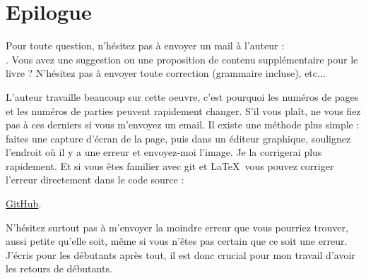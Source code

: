﻿\part*{Epilogue}


Pour toute question, n'hésitez pas à envoyer un mail à l'auteur : \\
\GTT{<\EMAIL>}.
Vous avez une suggestion ou une proposition de contenu supplémentaire pour le livre ?
N'hésitez pas à envoyer toute correction (grammaire incluse), etc...

L'auteur travaille beaucoup sur cette oeuvre, c'est pourquoi les numéros de pages
et les numéros de parties peuvent rapidement changer.
S'il vous plaît, ne vous fiez pas à ces derniers si vous m'envoyez un email. 
Il existe une méthode plus simple : faites une capture d'écran de la page, puis dans
un éditeur graphique, soulignez l'endroit où il y a une erreur et envoyez-moi l'image.
Je la corrigerai plus rapidement.
Et si vous êtes familier avec git et \LaTeX\, vous pouvez corriger l'erreur directement
dans le code source :

\href{http://go.yurichev.com/17089}{GitHub}.

N'hésitez surtout pas à m'envoyer la moindre erreur que vous pourriez trouver, aussi
petite qu'elle soit, même si vous n'êtes pas certain que ce soit une erreur.
J'écris pour les débutants après tout, il est donc crucial pour mon travail d'avoir
les retours de débutants.

